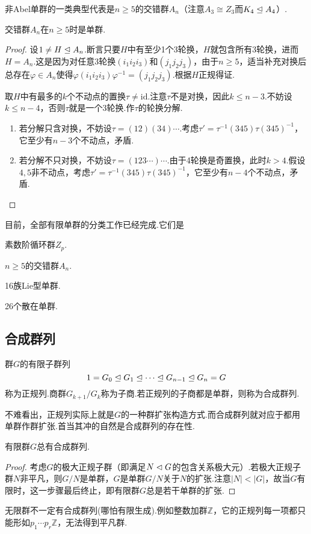 非Abel单群的一类典型代表是$n\ge 5$的交错群$A_n$（注意$A_3\cong Z_3$而$K_4\trianglelefteq A_4$）.

\begin{thm}
	交错群$A_n$在$n\ge 5$时是单群.
\end{thm}
\begin{proof}
	设$1\ne H\trianglelefteq A_n$.断言只要$H$中有至少1个3轮换，$H$就包含所有3轮换，进而$H=A_n$.这是因为对任意3轮换$(i_1i_2i_3)$和$(j_1j_2j_3)$，由于$n\ge 5$，适当补充对换后总存在$\varphi\in A_n$使得$\varphi(i_1i_2i_3)\varphi^{-1}=(j_1j_2j_3)$.根据$H$正规得证.

	取$H$中有最多的$k$个不动点的置换$\tau\ne\mathrm{id}$.注意$\tau$不是对换，因此$k\le n-3$.不妨设$k\le n-4$，否则$\tau$就是一个3轮换.作$\tau$的轮换分解.
	\begin{enumerate}
		\item 若分解只含对换，不妨设$\tau=(12)(34)\cdots$.考虑$\tau'=\tau^{-1}(345)\tau(345)^{-1}$，它至少有$n-3$个不动点，矛盾.
		\item 若分解不只对换，不妨设$\tau=(123\cdots)\cdots$.由于4轮换是奇置换，此时$k>4$.假设$4,5$非不动点，考虑$\tau'=\tau^{-1}(345)\tau(345)^{-1}$，它至少有$n-4$个不动点，矛盾.
	\end{enumerate}
\end{proof}

目前，全部有限单群的分类工作已经完成.它们是

\noindent\begin{enumerate*}
	\item 素数阶循环群$Z_p$.
	\item $n\ge 5$的交错群$A_n$.
	\item 16族Lie型单群.
	\item 26个散在单群.
\end{enumerate*}

\subsection{合成群列}
\begin{definition}
	群$G$的有限子群列
	\[
		1=G_0\trianglelefteq G_1\trianglelefteq\cdots\trianglelefteq G_{n-1}\trianglelefteq G_n=G
	\]
	称为{\heiti 正规列}.商群$G_{k+1}/G_k$称为{\heiti 子商}.若正规列的子商都是单群，则称为{\heiti 合成群列}.
\end{definition}

不难看出，正规列实际上就是$G$的一种群扩张构造方式.而合成群列就对应于都用单群作群扩张.首当其冲的自然是合成群列的存在性.
\begin{lemma*}
	有限群$G$总有合成群列.
\end{lemma*}
\begin{proof}
	考虑$G$的{\heiti 极大正规子群}（即满足$N\vartriangleleft G$的包含关系极大元）.若极大正规子群$N$非平凡，则$G/N$是单群，$G$是单群$G/N$关于$N$的扩张.注意$|N|<|G|$，故当$G$有限时，这一步骤最后终止，即有限群$G$总是若干单群的扩张.
\end{proof}
\begin{remark}
	无限群不一定有合成群列(哪怕有限生成).例如整数加群$\mathbb{Z}$，它的正规列每一项都只能形如$p_1\cdots p_r\mathbb{Z}$，无法得到平凡群.
\end{remark}

